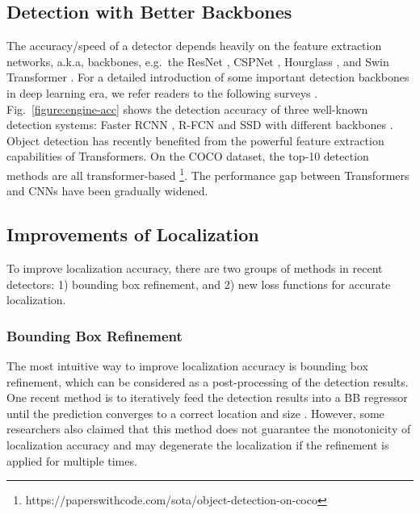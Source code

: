 \documentclass[lettersize,journal]{IEEEtran}
\begin{document}
\subsection{Detection with Better Backbones}\label{subsec:detection}

The accuracy/speed of a detector depends heavily on the feature extraction networks, a.k.a, backbones, e.g.\ the ResNet \cite{CVPR16-ResNet}, CSPNet \cite{wang2020cspnet}, Hourglass \cite{newell2016stacked}, and Swin Transformer \cite{liu2021swin}. For a detailed introduction of some important detection backbones in deep learning era, we refer readers to the following surveys \cite{arXiv15-SurveyAdvCNN}. Fig.\ \ref{figure:engine-acc} shows the detection accuracy of three well-known detection systems: Faster RCNN \cite{NIPS15-FasterRCNN}, R-FCN \cite{NIPS16-RFCN} and  SSD \cite{ECCV16-SSD} with different backbones \cite{CVPR17-SurveyTradeOffs}. Object detection has recently benefited from the powerful feature extraction capabilities of Transformers. On the COCO dataset, the top-10 detection methods are all transformer-based \footnote{https://paperswithcode.com/sota/object-detection-on-coco}. The performance gap between Transformers and CNNs have been gradually widened.







\subsection{Improvements of Localization}\label{subsec:improve_loc}

To improve localization accuracy, there are two groups of methods in recent detectors: 1) bounding box refinement, and 2) new loss functions for accurate localization.

\subsubsection{Bounding Box Refinement}

The most intuitive way to improve localization accuracy is bounding box refinement, which can be considered as a post-processing of the detection results. One recent method is to iteratively feed the detection results into a BB regressor until the prediction converges to a correct location and size  \cite{arXiv17-CascadeRCNN, ITSC16-RefineNet, IAPR17-RefineFaster}. However, some researchers also claimed that this method does not guarantee the monotonicity of localization accuracy \cite{arXiv17-CascadeRCNN} and may degenerate the localization if the refinement is applied for multiple times.
\end{document}
